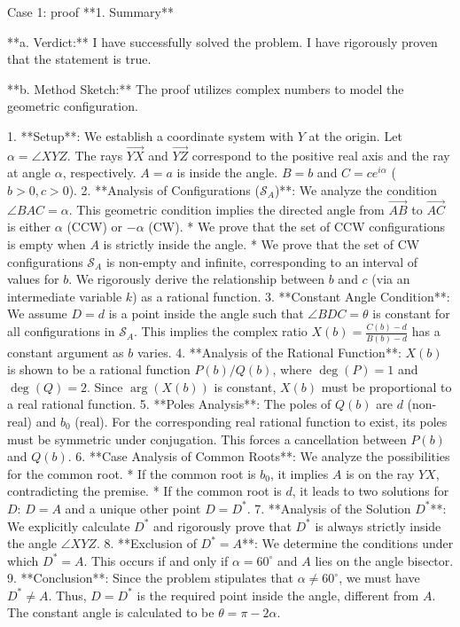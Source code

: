 \documentclass{article} %
\begin{document}
\begin{promptbox}{Case 1: proof}
**1. Summary**

**a. Verdict:** I have successfully solved the problem. I have rigorously proven that the statement is true.

**b. Method Sketch:**
The proof utilizes complex numbers to model the geometric configuration.

1.  **Setup**: We establish a coordinate system with $Y$ at the origin. Let $\alpha = \angle XYZ$. The rays $\overrightarrow{YX}$ and $\overrightarrow{YZ}$ correspond to the positive real axis and the ray at angle $\alpha$, respectively. $A=a$ is inside the angle. $B=b$ and $C=ce^{i\alpha}$ ($b>0, c>0$).
2.  **Analysis of Configurations ($\mathcal{S}_A$)**: We analyze the condition $\angle BAC = \alpha$. This geometric condition implies the directed angle from $\vec{AB}$ to $\vec{AC}$ is either $\alpha$ (CCW) or $-\alpha$ (CW).
    *   We prove that the set of CCW configurations is empty when $A$ is strictly inside the angle.
    *   We prove that the set of CW configurations $\mathcal{S}_A$ is non-empty and infinite, corresponding to an interval of values for $b$. We rigorously derive the relationship between $b$ and $c$ (via an intermediate variable $k$) as a rational function.
3.  **Constant Angle Condition**: We assume $D=d$ is a point inside the angle such that $\angle BDC=\theta$ is constant for all configurations in $\mathcal{S}_A$. This implies the complex ratio $X(b) = \frac{C(b)-d}{B(b)-d}$ has a constant argument as $b$ varies.
4.  **Analysis of the Rational Function**: $X(b)$ is shown to be a rational function $P(b)/Q(b)$, where $\deg(P)=1$ and $\deg(Q)=2$. Since $\arg(X(b))$ is constant, $X(b)$ must be proportional to a real rational function.
5.  **Poles Analysis**: The poles of $Q(b)$ are $d$ (non-real) and $b_0$ (real). For the corresponding real rational function to exist, its poles must be symmetric under conjugation. This forces a cancellation between $P(b)$ and $Q(b)$.
6.  **Case Analysis of Common Roots**: We analyze the possibilities for the common root.
    *   If the common root is $b_0$, it implies $A$ is on the ray $YX$, contradicting the premise.
    *   If the common root is $d$, it leads to two solutions for $D$: $D=A$ and a unique other point $D=D^*$.
7.  **Analysis of the Solution $D^*$**: We explicitly calculate $D^*$ and rigorously prove that $D^*$ is always strictly inside the angle $\angle XYZ$.
8.  **Exclusion of $D^*=A$**: We determine the conditions under which $D^*=A$. This occurs if and only if $\alpha = 60^\circ$ and $A$ lies on the angle bisector.
9.  **Conclusion**: Since the problem stipulates that $\alpha \ne 60^\circ$, we must have $D^* \ne A$. Thus, $D=D^*$ is the required point inside the angle, different from $A$. The constant angle is calculated to be $\theta = \pi-2\alpha$.


\end{promptbox}
\end{document}
